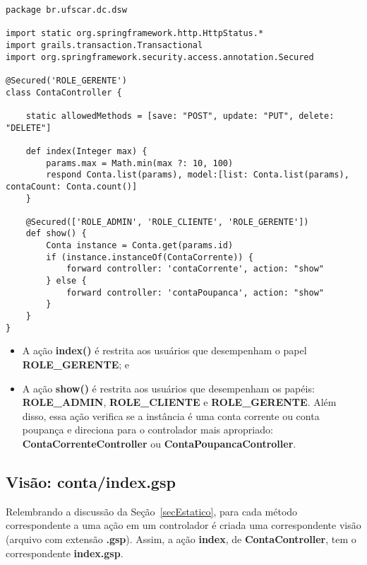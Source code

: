 \begin{lstlisting}[caption=Controlador    {\bf    ContaController},   frame    =
    trBL,float=htbp, label=codContaController] 
package br.ufscar.dc.dsw

import static org.springframework.http.HttpStatus.*
import grails.transaction.Transactional
import org.springframework.security.access.annotation.Secured

@Secured('ROLE_GERENTE')
class ContaController {
    
    static allowedMethods = [save: "POST", update: "PUT", delete: "DELETE"]
    
    def index(Integer max) {
        params.max = Math.min(max ?: 10, 100)
        respond Conta.list(params), model:[list: Conta.list(params), contaCount: Conta.count()]
    }
    
    @Secured(['ROLE_ADMIN', 'ROLE_CLIENTE', 'ROLE_GERENTE'])
    def show() {
        Conta instance = Conta.get(params.id)
        if (instance.instanceOf(ContaCorrente)) {
            forward controller: 'contaCorrente', action: "show"
        } else {
            forward controller: 'contaPoupanca', action: "show"
        }
    }
}

\end{lstlisting}

\begin{itemize}

\item A ação {\bf index()} é  restrita aos usuários que desempenham o papel {\bf
  ROLE\_GERENTE}; e 

\vspace{0,3cm}

\item A  ação {\bf show()}  é restrita aos  usuários que desempenham  os papéis:
  {\bf ROLE\_ADMIN}, {\bf ROLE\_CLIENTE} e {\bf ROLE\_GERENTE}. Além disso, essa
  ação  verifica  se a  instância  é  uma conta  corrente  ou  conta poupança  e
  direciona para o controlador mais apropriado: {\bf ContaCorrenteController} ou
  {\bf ContaPoupancaController}.  

\end{itemize}

\subsection{Visão: conta/index.gsp}

\vspace{0.5cm}

Relembrando   a   discussão  da   Seção~\ref{secEstatico},   para  cada   método
correspondente a  uma ação em um  controlador é criada  uma correspondente visão
(arquivo  com  extensão  {\bf  .gsp}).  Assim,  a  ação  {\bf  index},  de  {\bf
  ContaController}, tem o correspondente {\bf index.gsp}.  

